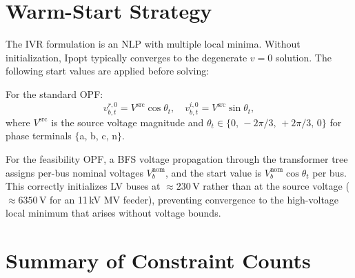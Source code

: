 \documentclass[11pt,a4paper]{article}
\begin{document}
\section{Warm-Start Strategy}

The IVR formulation is an NLP with multiple local minima.  Without
initialization, Ipopt typically converges to the degenerate $v = 0$ solution.
The following start values are applied before solving:

For the standard OPF:
\begin{equation}
  v^{r,0}_{b,t} = V^\text{src} \cos\theta_t,\quad
  v^{i,0}_{b,t} = V^\text{src} \sin\theta_t,
\end{equation}
where $V^\text{src}$ is the source voltage magnitude and
$\theta_t \in \{0,\,-2\pi/3,\,+2\pi/3,\,0\}$ for phase terminals
$\{$a, b, c, n$\}$.

For the feasibility OPF, a BFS voltage propagation through the transformer
tree assigns per-bus nominal voltages $V^\text{nom}_b$, and the start value
is $V^\text{nom}_b\cos\theta_t$ per bus.  This correctly initializes LV buses
at $\approx 230$\,V rather than at the source voltage ($\approx 6350$\,V for
an 11\,kV MV feeder), preventing convergence to the high-voltage local minimum
that arises without voltage bounds.

\section{Summary of Constraint Counts}
\end{document}
